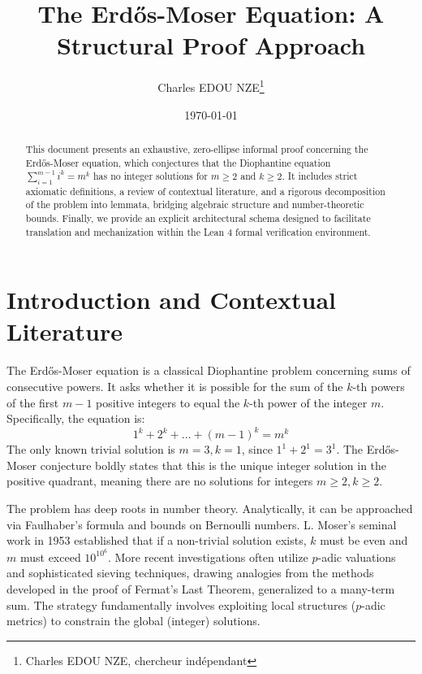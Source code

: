 \documentclass[11pt,a4paper]{article}
\title{The Erd\H{o}s-Moser Equation: A Structural Proof Approach}
\author{Charles EDOU NZE\thanks{Charles EDOU NZE, chercheur indépendant}}
\date{\today}
\begin{document}
\maketitle

\begin{abstract}
This document presents an exhaustive, zero-ellipse informal proof concerning the Erd\H{o}s-Moser equation, which conjectures that the Diophantine equation $\sum_{i=1}^{m-1} i^k = m^k$ has no integer solutions for $m \ge 2$ and $k \ge 2$. It includes strict axiomatic definitions, a review of contextual literature, and a rigorous decomposition of the problem into lemmata, bridging algebraic structure and number-theoretic bounds. Finally, we provide an explicit architectural schema designed to facilitate translation and mechanization within the Lean 4 formal verification environment.
\end{abstract}

\tableofcontents

\newpage

\section{Introduction and Contextual Literature}
The Erd\H{o}s-Moser equation is a classical Diophantine problem concerning sums of consecutive powers. It asks whether it is possible for the sum of the $k$-th powers of the first $m-1$ positive integers to equal the $k$-th power of the integer $m$. Specifically, the equation is:
\begin{equation}
1^k + 2^k + \dots + (m-1)^k = m^k
\end{equation}
The only known trivial solution is $m=3, k=1$, since $1^1 + 2^1 = 3^1$. The Erd\H{o}s-Moser conjecture boldly states that this is the unique integer solution in the positive quadrant, meaning there are no solutions for integers $m \ge 2, k \ge 2$.

The problem has deep roots in number theory. Analytically, it can be approached via Faulhaber's formula and bounds on Bernoulli numbers. L. Moser's seminal work in 1953 established that if a non-trivial solution exists, $k$ must be even and $m$ must exceed $10^{10^6}$. More recent investigations often utilize $p$-adic valuations and sophisticated sieving techniques, drawing analogies from the methods developed in the proof of Fermat's Last Theorem, generalized to a many-term sum. The strategy fundamentally involves exploiting local structures ($p$-adic metrics) to constrain the global (integer) solutions.
\end{document}
